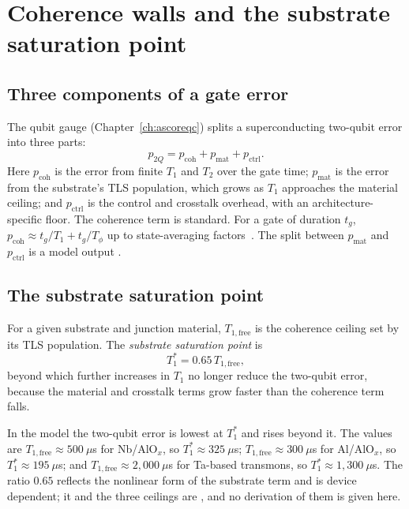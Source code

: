 \chapter{Coherence walls and the substrate saturation point}\label{ch:walls}

\section{Three components of a gate error}

The qubit gauge (Chapter~\ref{ch:ascoreqc}) splits a superconducting two-qubit error into three parts:
\begin{equation}
 p_{2Q}=p_{\mathrm{coh}}+p_{\mathrm{mat}}+p_{\mathrm{ctrl}} .
 \label{eq:pdecomp}
\end{equation}
Here $p_{\mathrm{coh}}$ is the error from finite $T_1$ and $T_2$ over the gate time;
$p_{\mathrm{mat}}$ is the error from the substrate's TLS population, which grows as $T_1$
approaches the material ceiling; and $p_{\mathrm{ctrl}}$ is the control and crosstalk overhead,
with an architecture-specific floor. The coherence term is standard. For a gate of duration
$t_g$, $p_{\mathrm{coh}}\approx t_g/T_1+t_g/T_\phi$ up to state-averaging factors~\cite{Abad2022}.
The split between $p_{\mathrm{mat}}$ and $p_{\mathrm{ctrl}}$ is a model output \calibrated.

\section{The substrate saturation point}

\begin{definition}
For a given substrate and junction material, $T_{1,\mathrm{free}}$ is the coherence ceiling
set by its TLS population. The \emph{substrate saturation point} is
\begin{equation}
 T_1^*=0.65\,T_{1,\mathrm{free}},
\end{equation}
beyond which further increases in $T_1$ no longer reduce the two-qubit error, because the
material and crosstalk terms grow faster than the coherence term falls.
\end{definition}

\noindent In the model the two-qubit error is lowest at $T_1^*$ and rises beyond it. The values are
$T_{1,\mathrm{free}}\approx500\ \mu$s for Nb/AlO$_x$, so $T_1^*\approx325\ \mu$s; $T_{1,\mathrm{free}}\approx300\ \mu$s for Al/AlO$_x$,
so $T_1^*\approx195\ \mu$s; and $T_{1,\mathrm{free}}\approx2{,}000\ \mu$s for Ta-based transmons, so $T_1^*\approx1{,}300\ \mu$s. The ratio $0.65$
reflects the nonlinear form of the substrate term and is device dependent; it and the three ceilings are \calibrated, and no derivation of them is given here.

